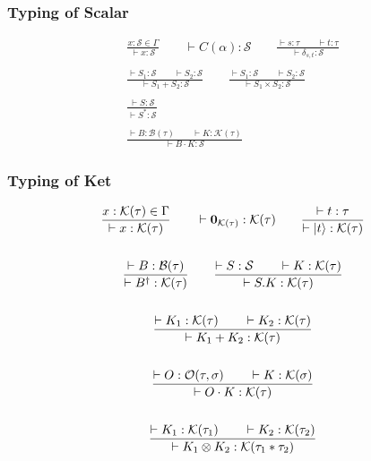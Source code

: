 \subsubsection*{Typing of Scalar}
  \begin{gather*}
    \frac{x : \mathcal{S} \in \Gamma}{\vdash x : \mathcal{S}}
    \qquad 
    \vdash C(\alpha) : \mathcal{S}
    \qquad
    \frac{\vdash s : \tau \qquad \vdash t : \tau}{\vdash \delta_{s, t} : \mathcal{S}} \\
    \\
    \frac{\vdash S_1 : \mathcal{S} \qquad \vdash S_2 : \mathcal{S}}{\vdash S_1 + S_2 : \mathcal{S}}
    \qquad
    \frac{\vdash S_1 : \mathcal{S} \qquad \vdash S_2 : \mathcal{S}}{\vdash S_1 \times S_2 : \mathcal{S}} \\
    \\
    \frac{\vdash S : \mathcal{S}}{\vdash S^* : \mathcal{S}} \\
    \\
    \frac{\vdash B : \mathcal{B}(\tau) \qquad \vdash K : \mathcal{K}(\tau)}{\vdash B \cdot K : \mathcal{S}}
  \end{gather*}


\subsubsection*{Typing of Ket}
  \begin{gather*}
    \frac{x : \mathcal{K}(\tau) \in \Gamma}{\vdash x : \mathcal{K}(\tau)}
    \qquad
    \vdash \mathbf{0}_{\mathcal{K}(\tau)} : \mathcal{K}(\tau)
    \qquad
    \frac{\vdash t : \tau}{\vdash |t\rangle : \mathcal{K}(\tau)} \\
    \\
    \frac{\vdash B : \mathcal{B}(\tau)}{\vdash B^\dagger : \mathcal{K}(\tau)}
    \qquad
    \frac{\vdash S : \mathcal{S} \qquad \vdash K : \mathcal{K}(\tau)}{\vdash S.K : \mathcal{K}(\tau)} \\
    \\
    \frac{\vdash K_1 : \mathcal{K}(\tau) \qquad \vdash K_2 : \mathcal{K}(\tau)}{\vdash K_1 + K_2 : \mathcal{K}(\tau)} \\
    \\
    \frac{\vdash O : \mathcal{O}(\tau, \sigma) \qquad \vdash K : \mathcal{K}(\sigma)}{\vdash O \cdot K : \mathcal{K}(\tau)} \\
    \\
    \frac{\vdash K_1 : \mathcal{K}(\tau_1) \qquad \vdash K_2 : \mathcal{K}(\tau_2)}{\vdash K_1 \otimes K_2 : \mathcal{K}(\tau_1 * \tau_2)}
  \end{gather*}


